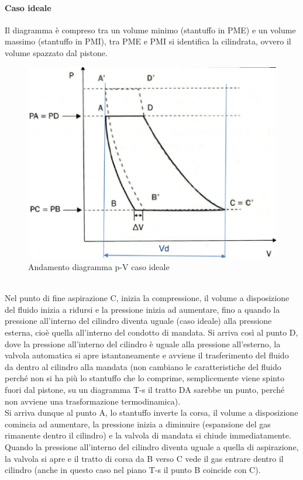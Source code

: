 \paragraph{Caso ideale}Il diagramma è compreso tra un volume minimo (stantuffo in PME) e un volume massimo (stantuffo in PMI), tra PME e PMI si identifica la cilindrata, ovvero il volume spazzato dal pistone. \\
\begin{figure}[h]
    \centering
    \includegraphics{Immagini/CasoIdeale.png}
    \caption{Andamento diagramma p-V caso ideale}
    \label{fig:CasoIdeale}
\end{figure}
\\
Nel punto di fine aspirazione C, inizia la compressione, il volume a disposizione del fluido inizia a ridursi e la pressione inizia ad aumentare, fino a quando la pressione all’interno del cilindro diventa uguale (caso ideale) alla pressione esterna, cioè quella all'interno del condotto di mandata.  Si arriva così al punto D, dove la pressione all’interno del cilindro è uguale alla pressione all’esterno, la valvola automatica si apre istantaneamente e avviene il trasferimento del fluido da dentro al cilindro alla mandata (non cambiano le caratteristiche del fluido perché non si ha più lo stantuffo che lo comprime, semplicemente viene spinto fuori dal pistone, su un diagramma T-s il tratto DA sarebbe un punto, perché non avviene una trasformazione termodinamica). \\
Si arriva dunque al punto A, lo stantuffo inverte la corsa, il volume a disposizione comincia ad aumentare, la pressione inizia a diminuire (espansione del gas rimanente dentro il cilindro) e la valvola di mandata si chiude immediatamente. Quando la pressione all'interno del cilindro diventa uguale a quella di aspirazione, la valvola si apre e il tratto di  corsa da B verso C vede il gas entrare dentro il cilindro (anche in questo caso nel piano T-s il punto B coincide con C). \\
